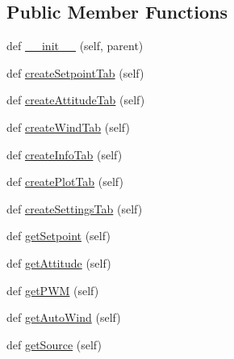 \subsection*{Public Member Functions}
\begin{DoxyCompactItemize}
\item 
def \mbox{\hyperlink{classwindshape_1_1gui_1_1widgets_1_1_control_panel_1_1_control_panel_aa35623692da665ef07969e15b98f158e}{\+\_\+\+\_\+init\+\_\+\+\_\+}} (self, parent)
\item 
def \mbox{\hyperlink{classwindshape_1_1gui_1_1widgets_1_1_control_panel_1_1_control_panel_a737c867fe353e2aa44e064cd46633d21}{create\+Setpoint\+Tab}} (self)
\item 
def \mbox{\hyperlink{classwindshape_1_1gui_1_1widgets_1_1_control_panel_1_1_control_panel_a60f1e1548d1f79aac6f474c0beaabbfa}{create\+Attitude\+Tab}} (self)
\item 
def \mbox{\hyperlink{classwindshape_1_1gui_1_1widgets_1_1_control_panel_1_1_control_panel_a354b1be4355bbb095dca97edfdc64b0a}{create\+Wind\+Tab}} (self)
\item 
def \mbox{\hyperlink{classwindshape_1_1gui_1_1widgets_1_1_control_panel_1_1_control_panel_af7ffe8727031aa36ee612fe6b2e44e8f}{create\+Info\+Tab}} (self)
\item 
def \mbox{\hyperlink{classwindshape_1_1gui_1_1widgets_1_1_control_panel_1_1_control_panel_a399541328b581ef0ba6a56fa7309b3d4}{create\+Plot\+Tab}} (self)
\item 
def \mbox{\hyperlink{classwindshape_1_1gui_1_1widgets_1_1_control_panel_1_1_control_panel_afac9dab02e9d0ffaa5f6e6df0c2cd9dd}{create\+Settings\+Tab}} (self)
\item 
def \mbox{\hyperlink{classwindshape_1_1gui_1_1widgets_1_1_control_panel_1_1_control_panel_a932992dcb87b04907fe62c8e24959343}{get\+Setpoint}} (self)
\item 
def \mbox{\hyperlink{classwindshape_1_1gui_1_1widgets_1_1_control_panel_1_1_control_panel_aedddb67cf71e99a4a9055c88b757ccdf}{get\+Attitude}} (self)
\item 
def \mbox{\hyperlink{classwindshape_1_1gui_1_1widgets_1_1_control_panel_1_1_control_panel_a6c845a7349359434799e4fda9b9e6bf3}{get\+P\+WM}} (self)
\item 
def \mbox{\hyperlink{classwindshape_1_1gui_1_1widgets_1_1_control_panel_1_1_control_panel_a66b7923ba30952dbb75f1351f1046c60}{get\+Auto\+Wind}} (self)
\item 
def \mbox{\hyperlink{classwindshape_1_1gui_1_1widgets_1_1_control_panel_1_1_control_panel_ad0f737f5704a7863c672bdac8314ddd3}{get\+Source}} (self)

\end{DoxyCompactItemize}
